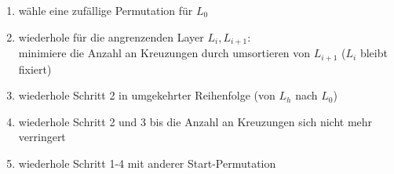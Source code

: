 \begin{algorithm}[H]
	\SetAlgoVlined
	\BlankLine
	\begin{enumerate}
		\item wähle eine zufällige Permutation für $L_0$
		\item wiederhole für die angrenzenden Layer $L_i,L_{i+1}$:\\
			minimiere die Anzahl an Kreuzungen durch umsortieren von $L_{i+1}$ ($L_i$ bleibt fixiert)
		\item wiederhole Schritt 2 in umgekehrter Reihenfolge (von $L_h$ nach $L_0$)
		\item wiederhole Schritt 2 und 3 bis die Anzahl an Kreuzungen sich nicht mehr verringert
		\item wiederhole Schritt 1-4 mit anderer Start-Permutation
	\end{enumerate}
\end{algorithm}